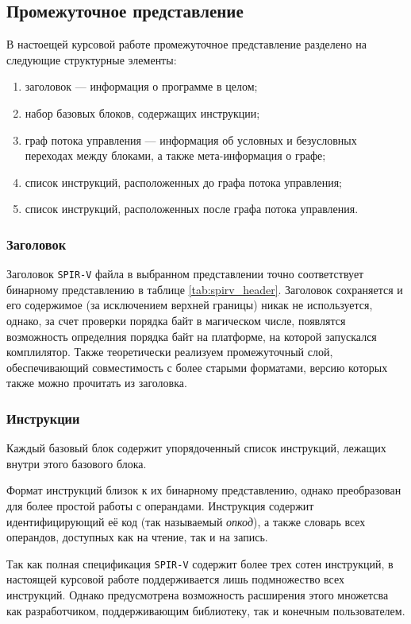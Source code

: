 \documentclass[14pt]{extarticle}
\begin{document}
\subsection{Промежуточное представление}
В настоещей курсовой работе промежуточное представление разделено на следующие структурные элементы:
\begin{enumerate}
	\item заголовок --- информация о программе в целом;
	\item набор базовых блоков, содержащих инструкции;
	\item граф потока управления --- информация об условных и безусловных переходах между блоками, а также мета-информация о графе;
	\item список инструкций, расположенных до графа потока управления;
	\item список инструкций, расположенных после графа потока управления.
\end{enumerate}

\subsubsection{Заголовок}
Заголовок \texttt{SPIR-V} файла в выбранном представлении точно соответствует бинарному представлению в таблице \ref{tab:spirv_header}. Заголовок сохраняется и его содержимое (за исключением верхней границы) никак не используется, однако, за счет проверки порядка байт в магическом числе, появлятся возможность определния порядка байт на платформе, на которой запускался комплилятор. Также теоретически реализуем промежуточный слой, обеспечивающий совместимость с более старыми форматами, версию которых также можно прочитать из заголовка.

\subsubsection{Инструкции}
Каждый базовый блок содержит упорядоченный список инструкций, лежащих внутри этого базового блока.

Формат инструкций близок к их бинарному представлению, однако преобразован для более простой работы с операндами. Инструкция содержит идентифицирующий её код (так называемый \emph{опкод}), а также словарь всех операндов, доступных как на чтение, так и на запись.

Так как полная спецификация \texttt{SPIR-V} содержит более трех сотен инструкций, в настоящей курсовой работе поддерживается лишь подмножество всех инструкций. Однако предусмотрена возможность расширения этого множетсва как разработчиком, поддерживающим библиотеку, так и конечным пользователем.
\end{document}
